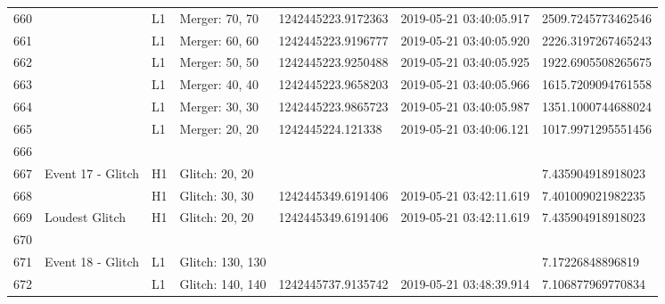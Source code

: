 \begin{longtable}{lllllll}
660  &                                                    &       L1 &    Merger: 70, 70 &  1242445223.9172363 &  2019-05-21 03:40:05.917 &  2509.7245773462546 \\
661  &                                                    &       L1 &    Merger: 60, 60 &  1242445223.9196777 &  2019-05-21 03:40:05.920 &  2226.3197267465243 \\
662  &                                                    &       L1 &    Merger: 50, 50 &  1242445223.9250488 &  2019-05-21 03:40:05.925 &  1922.6905508265675 \\
663  &                                                    &       L1 &    Merger: 40, 40 &  1242445223.9658203 &  2019-05-21 03:40:05.966 &  1615.7209094761558 \\
664  &                                                    &       L1 &    Merger: 30, 30 &  1242445223.9865723 &  2019-05-21 03:40:05.987 &  1351.1000744688024 \\
665  &                                                    &       L1 &    Merger: 20, 20 &   1242445224.121338 &  2019-05-21 03:40:06.121 &  1017.9971295551456 \\
666  &                                                    &          &                   &                     &                          &                     \\
667  &                                  Event 17 - Glitch &       H1 &    Glitch: 20, 20 &                     &                          &   7.435904918918023 \\
668  &                                                    &       H1 &    Glitch: 30, 30 &  1242445349.6191406 &  2019-05-21 03:42:11.619 &   7.401009021982235 \\
669  &                                     Loudest Glitch &       H1 &    Glitch: 20, 20 &  1242445349.6191406 &  2019-05-21 03:42:11.619 &   7.435904918918023 \\
670  &                                                    &          &                   &                     &                          &                     \\
671  &                                  Event 18 - Glitch &       L1 &  Glitch: 130, 130 &                     &                          &    7.17226848896819 \\
672  &                                                    &       L1 &  Glitch: 140, 140 &  1242445737.9135742 &  2019-05-21 03:48:39.914 &   7.106877969770834 \\

\end{longtable}
